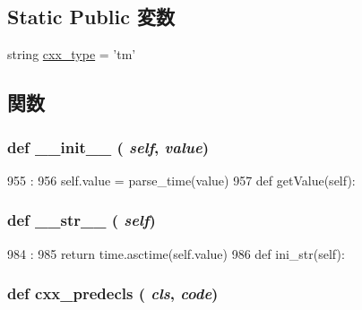 \subsection*{Static Public 変数}
\begin{DoxyCompactItemize}
\item 
string \hyperlink{classm5_1_1params_1_1Time_a2f1553ebb79374a68b36fdd6d8d82fc3}{cxx\_\-type} = 'tm'
\end{DoxyCompactItemize}


\subsection{関数}
\hypertarget{classm5_1_1params_1_1Time_ac775ee34451fdfa742b318538164070e}{
\subsubsection[{\_\-\_\-init\_\-\_\-}]{\setlength{\rightskip}{0pt plus 5cm}def \_\-\_\-init\_\-\_\- ( {\em self}, \/   {\em value})}}
\label{classm5_1_1params_1_1Time_ac775ee34451fdfa742b318538164070e}



\begin{DoxyCode}
955                              :
956         self.value = parse_time(value)
957 
    def getValue(self):
\end{DoxyCode}
\hypertarget{classm5_1_1params_1_1Time_aa7a4b9bc0941308e362738503137460e}{
\subsubsection[{\_\-\_\-str\_\-\_\-}]{\setlength{\rightskip}{0pt plus 5cm}def \_\-\_\-str\_\-\_\- ( {\em self})}}
\label{classm5_1_1params_1_1Time_aa7a4b9bc0941308e362738503137460e}



\begin{DoxyCode}
984                      :
985         return time.asctime(self.value)
986 
    def ini_str(self):
\end{DoxyCode}
\hypertarget{classm5_1_1params_1_1Time_a0b408a11a14bd1d770e28f71a6e14ab5}{
\subsubsection[{cxx\_\-predecls}]{\setlength{\rightskip}{0pt plus 5cm}def cxx\_\-predecls ( {\em cls}, \/   {\em code})}}
\label{classm5_1_1params_1_1Time_a0b408a11a14bd1d770e28f71a6e14ab5}


